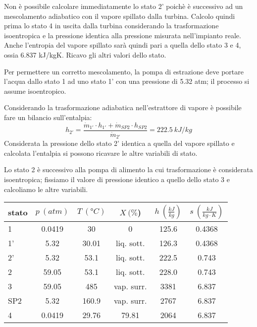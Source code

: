 Non è possibile calcolare immediatamente lo stato 2' poichè è successivo ad un mescolamento adiabatico con il vapore spillato dalla turbina. Calcolo quindi prima
lo stato 4 in uscita dalla turbina considerando la trasformazione isoentropica e la pressione identica alla pressione misurata nell'impianto reale.
Anche l'entropia del vapore spillato sarà quindi pari a quella dello stato 3 e 4, ossia 6.837 kJ/kgK. Ricavo gli altri valori dello stato.

Per permettere un corretto mescolamento, la pompa di estrazione deve portare l'acqua dallo stato 1 ad uno stato 1' con una pressione di 5.32 atm; il processo si assume
isoentropico.

Considerando la trasformazione adiabatica nell'estrattore di vapore è possibile fare un bilancio sull'entalpia:
\begin{equation*}
    h_{2'} = \frac{\dot m_{1'}\cdot h_{1'} + \dot m_{SP2} \cdot h_{SP2}}{\dot m_{2'}} = 222.5\ kJ/kg
\end{equation*}
Considerata la pressione dello stato 2' identica a quella del vapore spillato e calcolata l'entalpia si possono ricavare le altre variabili di stato.

Lo stato 2 è successivo alla pompa di alimento la cui trasformazione è considerata isoentropica; fissiamo il valore di pressione identico a quello dello stato 3 e calcoliamo
le altre variabili.
\begin{center}
    \begin{tabular}{l|c|c|c|c|c}
        stato    & $p\ (atm)$ & $T\ (\text{°}C) $&$X\ (\%$)& $h\ (\frac{kJ}{kg})$  & $s\ (\frac{kJ}{kg\cdot K})$\\ \hline
        1   &        0.0419 &            30   &    0      & 125.6    &0.4368 \\ \hline     %
        1'  &        5.32    &           30.01   &liq. sott.  & 126.3&0.4368 \\ \hline      %
        2'   &       5.32    &           53.1&liq. sott.& 222.5    &0.743 \\ \hline         %
        2   &        59.05   &           53.1&liq. sott.&  228.0   &0.743   \\ \hline       %
        3   &        59.05   &           485  & vap. surr.& 3381     &6.837  \\ \hline  %
        SP2  &       5.32        &       160.9 &  vap. surr.&2767     &6.837  \\ \hline  %
        4   &        0.0419       &      29.76&     79.81 & 2064     &6.837                 %
    \end{tabular}
\end{center}

